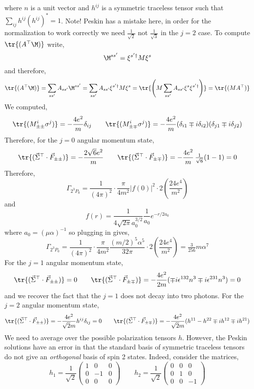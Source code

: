 \documentclass[12pt]{article}
\begin{document}
where $n$ is a unit vector and $h^{ij}$ is a symmetric traceless tensor such that $\sum_{ij} h^{ij} (h^{ij})^* = 1$. Note! Peskin has a mistake here, in order for the normalization to work correctly we need $\frac{1}{\sqrt{2}}$ not $\frac{1}{\sqrt{3}}$ in the $j = 2$ case. 
To compute $\tr{(A^\top \M)}$ write,
\[ \M^{s s'} = \xi^{s' \dagger} M \xi^s \] 
and therefore,
\[ \tr{(A^\top \M)} = \sum_{s s'} A_{ss'} \M^{s s'} = \sum_{s s'} A_{ss'} \xi^{s' \dagger} M \xi^s = \tr{\left( M \sum_{s s'} A_{ss'} \xi^s \xi^{s' \dagger} \right)} = \tr{(M A^\top)} \] 
We computed,
\[ \tr{(M^i_{\pm \pm} \sigma^j)} = -\frac{4 e^2}{m} \delta_{ij} \quad \quad \tr{(M^i_{\pm \mp} \sigma^j)} = -\frac{4 e^2}{m} (\delta_{i1} \mp i \delta_{i2}) (\delta_{j 1} \mp i \delta_{j 2}) \]
Therefore, for the $j = 0$ angular momentum state,
\[ \tr{(\vec{\Sigma}^{\top} \cdot \vec{F}_{\pm \pm})} = - \frac{2 \sqrt{6} e^2}{m}  \quad \quad \tr{(\vec{\Sigma}^{\top} \cdot \vec{F}_{\pm \mp})} = -\frac{4 e^2}{m} \, \tfrac{1}{\sqrt{6}} (1 - 1) = 0 \]
Therefore,
\[ \Gamma_{2^{3} P_0} = \frac{1}{(4 \pi)^2} \cdot \frac{\pi}{4m^2} |f(0)|^2 \cdot 2 \left( \frac{24 e^4}{m^2} \right) \]
and 
\[ f(r) = \frac{1}{4 \sqrt{2 \pi} a_0^{3/2}} \frac{1}{a_0} e^{-r / 2 a_0} \] 
where $a_0 = (\mu \alpha)^{-1}$ so plugging in gives,
\[ \Gamma_{2^{3} P_0} = \frac{1}{(4 \pi)^2} \cdot \frac{\pi}{4m^2}  \frac{(m/2)^5 \alpha^5}{32 \pi}  \cdot 2 \left( \frac{24 e^4}{m^2} \right) = \tfrac{3}{256} m \alpha^7 \]
For the $j = 1$ angular momentum state,
\[ \tr{(\vec{\Sigma}^{\top} \cdot \vec{F}_{\pm \pm})} = 0  \quad \quad \tr{(\vec{\Sigma}^{\top} \cdot \vec{F}_{\pm \mp})} = - \frac{4 e^2}{2m} (\mp i \epsilon^{132} n^3 \mp i \epsilon^{231} n^3) = 0 \]
and we recover the fact that the $j = 1$ does not decay into two photons.
For the $j = 2$ angular momentum state,
\[ \tr{(\vec{\Sigma}^{\top} \cdot \vec{F}_{\pm \pm})} = - \frac{4 e^2}{\sqrt{2} m} h^{ij} \delta_{ij} = 0  \quad \quad \tr{(\vec{\Sigma}^{\top} \cdot \vec{F}_{\pm \mp})} = - \frac{4 e^2}{\sqrt{2} m} (h^{11} - h^{22} \mp i h^{12} \mp i h^{21}) \]
We need to average over the possible polarization tensors $h$. However, the Peskin solutions have an error in that the standard basis of symmetric traceless tensors do not give an \textit{orthogonal} basis of spin 2 states. Indeed, consider the matrices,
\[ h_1 = \frac{1}{\sqrt{2}}
\begin{pmatrix}
1 & 0 & 0 
\\
0 & -1 & 0
\\
0 & 0  & 0
\end{pmatrix}
\quad \quad
h_2 = \frac{1}{\sqrt{2}}
\begin{pmatrix}
0 & 0 & 0
\\
0 & 1 & 0
\\
0 & 0 & -1 
\end{pmatrix} \]
\end{document}
